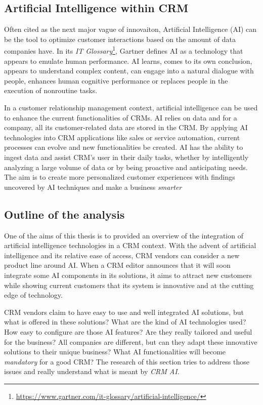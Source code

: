 \subsection{Artificial Intelligence within CRM}

Often cited as the next major vague of innovaiton, Artificial Intelligence (AI) can be the tool to optimize customer interactions based on the amount of data companies have. In its \textit{IT Glossary}\footnote{\url{https://www.gartner.com/it-glossary/artificial-intelligence/}}, Gartner defines AI as a technology that appears to emulate human performance. AI learns, comes to its own conclusion, appears to understand complex content, can engage into a natural dialogue with people, enhances human cognitive performance or replaces people in the execution of nonroutine tasks.

In a customer relationship management context, artificial intelligence can be used to enhance the current functionalities of CRMs. AI relies on data and for a company, all its customer-related data are stored in the CRM. By applying AI technologies into CRM applications like sales or service automation, current processes can evolve and new functionalities be created. AI has the ability to ingest data and assist CRM's user in their daily tasks, whether by intelligently analyzing a large volume of data or by being proactive and anticipating needs. The aim is to create more personalized customer experiences with findings uncovered by AI techniques and make a business \textit{smarter}


\subsection{Outline of the analysis}
One of the aims of this thesis is to provided an overview of the integration of artificial intelligence technologies in a CRM context. With the advent of artificial intelligence and its relative ease of access, CRM vendors can consider a new product line around AI. When a CRM editor announces that it will soon integrate some AI components in its solutions, it aims to attract new customers while showing current customers that its system is innovative and at the cutting edge of technology.

CRM vendors claim to have easy to use and well integrated AI solutions, but what is offered in these solutions? What are the kind of AI technologies used? How easy to configure are those AI features? Are they really tailored and useful for the business? All companies are different, but can they adapt these innovative solutions to their unique business? What AI functionalities will become \textit{mandatory} for a good CRM? The research of this section tries to address those issues and really understand what is meant by \textit{CRM AI}.


